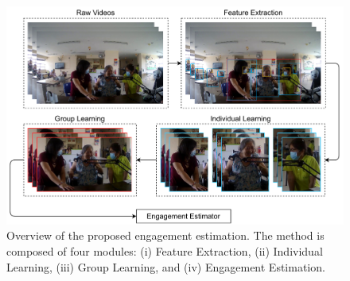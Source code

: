 \documentclass[VANCOUVER,STIX1COL]{WileyNJD-v2}
\begin{document}
\begin{figure}[t]
  \centering
  \includegraphics[width=0.82\linewidth]{assets/architecture}
  \caption{Overview of the proposed engagement estimation. The method is composed of four modules: (i) Feature Extraction, (ii) Individual Learning, (iii) Group Learning, and (iv) Engagement Estimation.}
  \label{f:architecture}
\end{figure}
\end{document}
